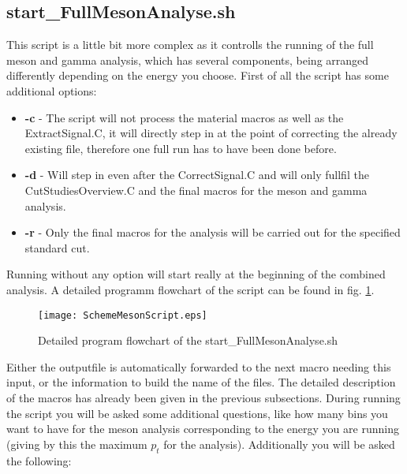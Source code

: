		\subsection{start\_FullMesonAnalyse.sh}
			This script is a little bit more complex as it controlls the running of the full meson and gamma analysis, which has several components, being arranged differently depending on the energy you choose. First of all the script has some additional options:
			\begin{itemize}
			 \item 	\textbf{-c} \hspace{1cm} - The script will not process the material macros as well as the ExtractSignal.C, it will directly step in at the point of correcting the already existing file, therefore one full run has to have been done before.
			 \item  \textbf{-d} \hspace{1cm} - Will step in even after the CorrectSignal.C and will only fullfil the CutStudiesOverview.C and the final macros for the meson and gamma analysis.
			 \item \textbf{-r} \hspace{1cm} - Only the final macros for the analysis will be carried out for the specified standard cut. 
			\end{itemize}
			Running without any option will start really at the beginning of the combined analysis. A detailed programm flowchart of the script can be found in fig. \ref{figSchemeMesonScript}.
			\begin{figure}
			 	\texttt{[image: SchemeMesonScript.eps]}
				\caption{Detailed program flowchart of the start\_FullMesonAnalyse.sh}
				\label{figSchemeMesonScript}
			\end{figure}
			Either the outputfile is automatically forwarded to the next macro needing this input, or the information to build the name of the files. The detailed description of the macros has already been given in the previous subsections.
			During running the script you will be asked some additional questions, like how many bins you want to have for the meson analysis corresponding to the energy you are running (giving by this the maximum $p_t$ for the analysis). Additionally you will be asked the following:
